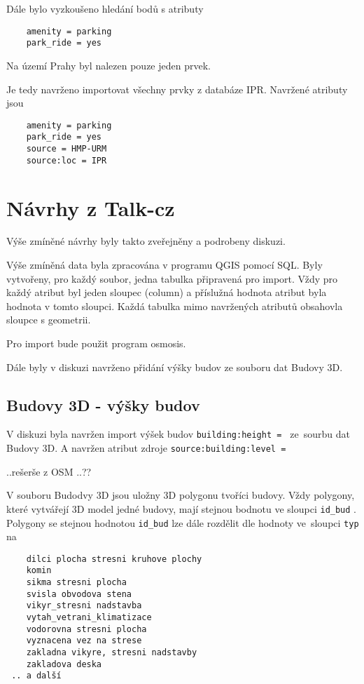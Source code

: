 Dále bylo vyzkoušeno hledání bodů s atributy 
\begin{verbatim}
    amenity = parking
    park_ride = yes
\end{verbatim}
Na území Prahy byl nalezen pouze jeden prvek.

Je tedy navrženo importovat všechny prvky z databáze IPR.
Navržené atributy jsou
\begin{verbatim}
    amenity = parking
    park_ride = yes
    source = HMP-URM
    source:loc = IPR
\end{verbatim}


\section{Návrhy z Talk-cz}
\label{Návrhy z Talk-cz}
Výše zmíněné návrhy byly takto zveřejněny a podrobeny diskuzi.

Výše zmíněná data byla zpracována v programu QGIS pomocí 
SQL. Byly vytvořeny, pro každý soubor, jedna tabulka připravená pro import.
Vždy pro každý atribut byl jeden sloupec (column) a příslužná hodnota atribut 
byla hodnota v tomto sloupci.
Každá tabulka mimo navržených atributů obsahovla sloupce s geometrii. 

Pro import  bude použit program osmosis.

Dále byly v diskuzi navrženo přidání výšky budov ze souboru dat Budovy 3D.

\subsection{Budovy 3D - výšky budov}
\label{Budovy 3D - výšky budov}
V diskuzi byla navržen import výšek budov {\tt building:height~= }
ze~sourbu dat Budovy 3D. 
A navržen atribut zdroje {\tt source:building:level~= }

..rešerše z OSM ..??

V souboru Budodvy 3D jsou uložny 3D polygonu tvoříci budovy.
Vždy polygony, které vytvářejí 3D model jedné budovy, 
mají stejnou bodnotu ve sloupci {\tt id\_bud} . 
Polygony se stejnou hodnotou {\tt id\_bud} lze dále rozdělit dle hodnoty 
ve~sloupci {\tt typ} na 
 
\begin{verbatim}
    dilci plocha stresni kruhove plochy
    komin
    sikma stresni plocha
    svisla obvodova stena
    vikyr_stresni nadstavba
    vytah_vetrani_klimatizace
    vodorovna stresni plocha
    vyznacena vez na strese
    zakladna vikyre, stresni nadstavby
    zakladova deska
 .. a další
\end{verbatim}

